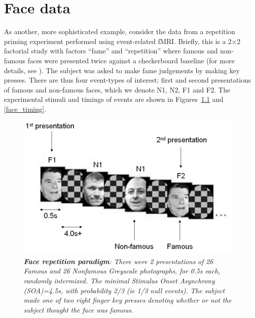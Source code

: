 \chapter{Face data \label{Chap:data:faces}}

As another, more sophisticated example, consider the data from a repetition priming experiment performed using event-related fMRI.
Briefly, this is a 2$\times$2 factorial study with factors ``fame'' and ``repetition'' where famous and non-famous faces were presented twice against a checkerboard baseline (for more details, see \cite{rnah_face_rep}). The subject was asked to make fame judgements by making key presses. There are thus four event-types of interest; first and second presentations of famous and non-famous faces, which we denote N1, N2, F1 and F2. The experimental stimuli and timings of events are shown in Figures~\ref{face_stim} and \ref{face_timing}.

\begin{figure}
\begin{center}
\includegraphics[width=120mm]{faces/face_stim}
\caption{\em \textbf{Face repetition paradigm}: There were 2 presentations of 26 Famous and 26 Nonfamous Greyscale photographs, for 0.5s each, randomly intermixed. The minimal Stimulus Onset Asynchrony (SOA)=4.5s, with probability 2/3 (ie 1/3 null events). The subject made one of two right finger key presses denoting whether or not the subject thought the face was famous. \label{face_stim}}
\end{center}
\end{figure}

